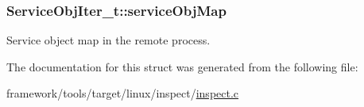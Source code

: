 \subsubsection[{\texorpdfstring{service\+Obj\+Map}{serviceObjMap}}]{ Service\+Obj\+Iter\+\_\+t\+::service\+Obj\+Map}\hypertarget{struct_service_obj_iter__t_a5fd38c48b804445d7035b732c6913e82}{}\label{struct_service_obj_iter__t_a5fd38c48b804445d7035b732c6913e82}


Service object map in the remote process. 



The documentation for this struct was generated from the following file\+:\begin{DoxyCompactItemize}
\item 
framework/tools/target/linux/inspect/\hyperlink{inspect_8c}{inspect.\+c}\end{DoxyCompactItemize}

